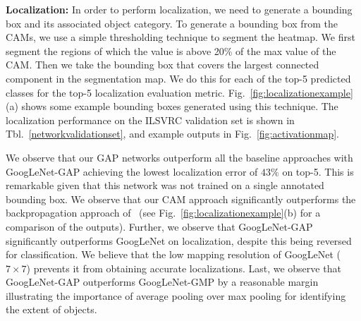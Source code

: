 \documentclass[10pt,twocolumn,letterpaper]{article}
\begin{document}
\textbf{Localization:} In order to perform localization, we need to generate a bounding box and its associated object category. To generate a bounding box from the CAMs, we use a simple thresholding technique to segment the heatmap. We first segment the regions of which the value is above 20\% of the max value of the CAM. Then we take the bounding box that covers the largest connected component in the segmentation map. We do this for each of the top-5 predicted classes for the top-5 localization evaluation metric. Fig.~\ref{fig:localizationexample}(a) shows some example bounding boxes generated using this technique. The localization performance on the ILSVRC validation set is shown in Tbl.~\ref{networkvalidationset}, and example outputs in Fig.~\ref{fig:activationmap}.

We observe that our GAP networks outperform all the baseline approaches with GoogLeNet-GAP achieving the lowest localization error of $43\%$ on top-5. This is remarkable given that this network was not trained on a single annotated bounding box. We observe that our CAM approach significantly outperforms the backpropagation approach of~\cite{simonyan2013deep} (see Fig.~\ref{fig:localizationexample}(b) for a comparison of the outputs). Further, we observe that GoogLeNet-GAP significantly outperforms GoogLeNet on localization, despite this being reversed for classification. We believe that the low mapping resolution of GoogLeNet ($7\times7$) prevents it from obtaining accurate localizations. Last, we observe that GoogLeNet-GAP outperforms GoogLeNet-GMP by a reasonable margin illustrating the importance of average pooling over max pooling for identifying the extent of objects.


\end{document}
